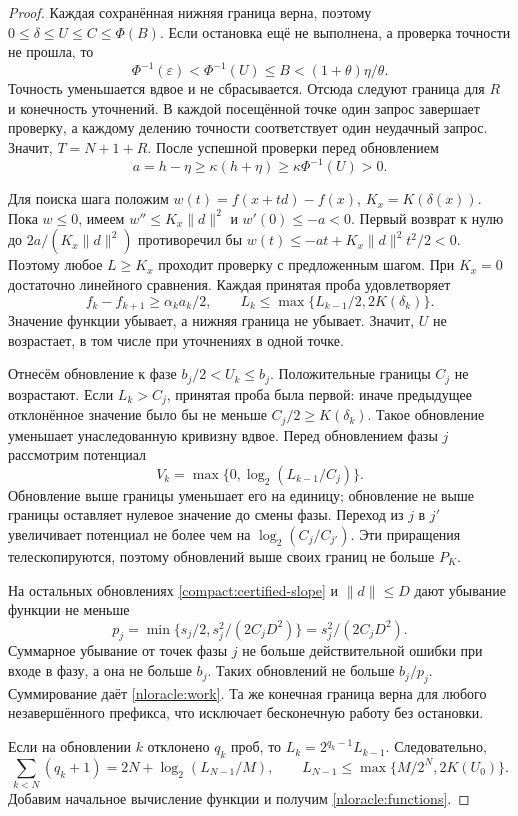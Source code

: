 \begin{proof}
Каждая сохранённая нижняя граница верна, поэтому
$0\le\delta\le U\le C\le\Phi(B)$.
Если остановка ещё не выполнена, а проверка точности не прошла, то
\[
 \Phi^{-1}(\varepsilon)<\Phi^{-1}(U)\le B
   <(1+\theta)\eta/\theta.
\]
Точность уменьшается вдвое и не сбрасывается. Отсюда следуют
граница для $R$ и конечность уточнений.
В каждой посещённой точке один запрос завершает проверку,
а каждому делению точности соответствует один неудачный запрос.
Значит, $T=N+1+R$.
После успешной проверки перед обновлением
\begin{equation}\label{compact:certified-slope}
 a=h-\eta\ge\kappa(h+\eta)\ge\kappa\Phi^{-1}(U)>0.
\end{equation}

Для поиска шага положим $w(t)=f(x+td)-f(x)$,
$K_x=K(\delta(x))$.
Пока $w\le0$, имеем $w''\le K_x\|d\|^2$ и $w'(0)\le-a<0$.
Первый возврат к нулю до $2a/(K_x\|d\|^2)$ противоречил бы
$w(t)\le-at+K_x\|d\|^2t^2/2<0$.
Поэтому любое $L\ge K_x$ проходит проверку с предложенным шагом.
При $K_x=0$ достаточно линейного сравнения.
Каждая принятая проба удовлетворяет
\begin{equation}\label{eq:acceptedprogress}
 f_k-f_{k+1}\ge\alpha_k a_k/2,\qquad
 L_k\le\max\{L_{k-1}/2,2K(\delta_k)\}.
\end{equation}
Значение функции убывает, а нижняя граница не убывает.
Значит, $U$ не возрастает, в том числе при уточнениях в одной точке.

Отнесём обновление к фазе $b_j/2<U_k\le b_j$.
Положительные границы $C_j$ не возрастают.
Если $L_k>C_j$, принятая проба была первой: иначе предыдущее
отклонённое значение было бы не меньше $C_j/2\ge K(\delta_k)$.
Такое обновление уменьшает унаследованную кривизну вдвое.
Перед обновлением фазы $j$ рассмотрим потенциал
\[
 V_k=\max\{0,\log_2(L_{k-1}/C_j)\}.
\]
Обновление выше границы уменьшает его на единицу;
обновление не выше границы оставляет нулевое значение до смены фазы.
Переход из $j$ в $j'$ увеличивает потенциал не более чем на
$\log_2(C_j/C_{j'})$. Эти приращения телескопируются,
поэтому обновлений выше своих границ не больше $P_K$.

На остальных обновлениях \eqref{compact:certified-slope} и
$\|d\|\le D$ дают убывание функции не меньше
\[
 p_j=\min\{s_j/2,s_j^2/(2C_jD^2)\}=s_j^2/(2C_jD^2).
\]
Суммарное убывание от точек фазы $j$ не больше действительной
ошибки при входе в фазу, а она не больше $b_j$.
Таких обновлений не больше $b_j/p_j$.
Суммирование даёт \eqref{nloracle:work}.
Та же конечная граница верна для любого незавершённого префикса,
что исключает бесконечную работу без остановки.

Если на обновлении $k$ отклонено $q_k$ проб, то
$L_k=2^{q_k-1}L_{k-1}$. Следовательно,
\[
 \sum_{k<N}(q_k+1)=2N+\log_2(L_{N-1}/M),\qquad
 L_{N-1}\le\max\{M/2^N,2K(U_0)\}.
\]
Добавим начальное вычисление функции и получим
\eqref{nloracle:functions}.
\end{proof}

